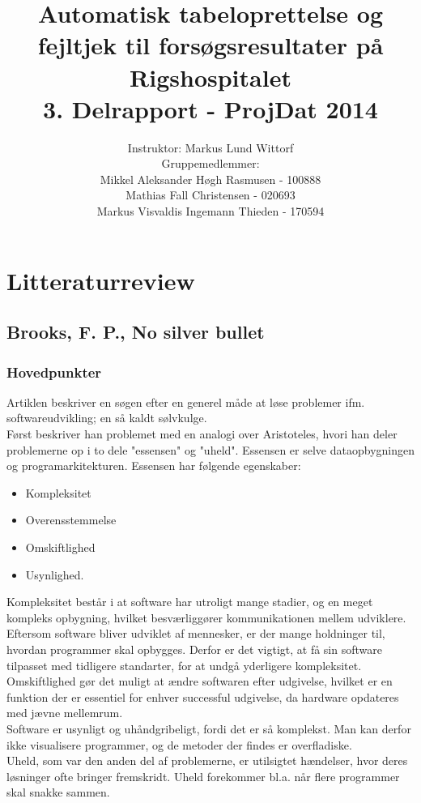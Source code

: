 \documentclass[11pt]{article}
\title{Automatisk tabeloprettelse og fejltjek til forsøgsresultater på Rigshospitalet\\
3. Delrapport - ProjDat 2014}
\author{Instruktor: Markus Lund Wittorf \\Gruppemedlemmer: \\ Mikkel Aleksander Høgh Rasmusen - 100888 \\ Mathias Fall Christensen - 020693 \\ Markus Visvaldis Ingemann Thieden - 170594}
\date{}
\begin{document}
\maketitle
\pagebreak
\tableofcontents
\pagebreak
\section{Litteraturreview}
\subsection{Brooks, F. P., No silver bullet}
\subsubsection{Hovedpunkter}
Artiklen beskriver en søgen efter en generel måde at løse problemer ifm. softwareudvikling; en så kaldt sølvkulge.\\
Først beskriver han problemet med en analogi over Aristoteles, hvori han deler problemerne op i to dele "essensen" og "uheld". Essensen er selve dataopbygningen og programarkitekturen. Essensen har følgende egenskaber:
\begin{itemize}
\item Kompleksitet
\item Overensstemmelse
\item Omskiftlighed
\item Usynlighed.
\end{itemize}
Kompleksitet består i at software har utroligt mange stadier, og en meget kompleks opbygning, hvilket besværliggører kommunikationen mellem udviklere.\\
Eftersom software bliver udviklet af mennesker, er der mange holdninger til, hvordan programmer skal opbygges. Derfor er det vigtigt, at få sin software tilpasset med tidligere standarter, for at undgå yderligere kompleksitet.\\
Omskiftlighed gør det muligt at ændre softwaren efter udgivelse, hvilket er en funktion der er essentiel for enhver successful udgivelse, da hardware opdateres med jævne mellemrum.\\
Software er usynligt og uhåndgribeligt, fordi det er så komplekst. Man kan derfor ikke visualisere programmer, og de metoder der findes er overfladiske.\\
Uheld, som var den anden del af problemerne, er utilsigtet hændelser, hvor deres løsninger ofte bringer fremskridt. Uheld forekommer bl.a. når flere programmer skal snakke sammen.\\
\end{document}
